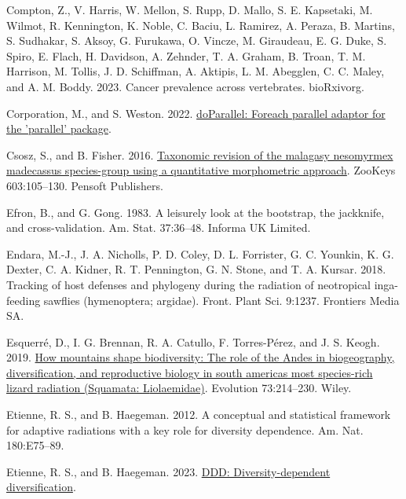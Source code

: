\documentclass[fleqn,10pt,lineno]{wlpeerj} %
\newlength{\cslhangindent}
\newlength{\cslentryspacingunit} %
\newenvironment{CSLReferences}[2] %
 {%
  \setlength{\parindent}{0pt}
  \ifodd #1
  \let\oldpar\par
  \def\par{\hangindent=\cslhangindent\oldpar}
  \fi
  \setlength{\parskip}{#2\cslentryspacingunit}
 }%
 {}
\begin{document}
\begin{CSLReferences}{1}{0}
\leavevmode{}%
Compton, Z., V. Harris, W. Mellon, S. Rupp, D. Mallo, S. E. Kapsetaki, M. Wilmot, R. Kennington, K. Noble, C. Baciu, L. Ramirez, A. Peraza, B. Martins, S. Sudhakar, S. Aksoy, G. Furukawa, O. Vincze, M. Giraudeau, E. G. Duke, S. Spiro, E. Flach, H. Davidson, A. Zehnder, T. A. Graham, B. Troan, T. M. Harrison, M. Tollis, J. D. Schiffman, A. Aktipis, L. M. Abegglen, C. C. Maley, and A. M. Boddy. 2023. Cancer prevalence across vertebrates. bioRxivorg.

\leavevmode{}%
Corporation, M., and S. Weston. 2022. \href{https://CRAN.R-project.org/package=doParallel}{doParallel: Foreach parallel adaptor for the 'parallel' package}.

\leavevmode{}%
Csosz, S., and B. Fisher. 2016. \href{https://doi.org/10.3897/zookeys.603.8271}{Taxonomic revision of the malagasy nesomyrmex madecassus species-group using a quantitative morphometric approach}. {ZooKeys} 603:105--130. Pensoft Publishers.

\leavevmode{}%
Efron, B., and G. Gong. 1983. A leisurely look at the bootstrap, the jackknife, and cross-validation. Am. Stat. 37:36--48. Informa UK Limited.

\leavevmode{}%
Endara, M.-J., J. A. Nicholls, P. D. Coley, D. L. Forrister, G. C. Younkin, K. G. Dexter, C. A. Kidner, R. T. Pennington, G. N. Stone, and T. A. Kursar. 2018. Tracking of host defenses and phylogeny during the radiation of neotropical inga-feeding sawflies (hymenoptera; argidae). Front. Plant Sci. 9:1237. Frontiers Media SA.

\leavevmode{}%
Esquerré, D., I. G. Brennan, R. A. Catullo, F. Torres-Pérez, and J. S. Keogh. 2019. \href{https://doi.org/10.1111/evo.13657}{How mountains shape biodiversity: The role of the {A}ndes in biogeography, diversification, and reproductive biology in south america{\textquotesingle}s most species-rich lizard radiation ({S}quamata: {L}iolaemidae)}. Evolution 73:214--230. Wiley.

\leavevmode{}%
Etienne, R. S., and B. Haegeman. 2012. A conceptual and statistical framework for adaptive radiations with a key role for diversity dependence. Am. Nat. 180:E75--89.

\leavevmode{}%
Etienne, R. S., and B. Haegeman. 2023. \href{https://CRAN.R-project.org/package=DDD}{DDD: Diversity-dependent diversification}.


\end{CSLReferences}
\end{document}
